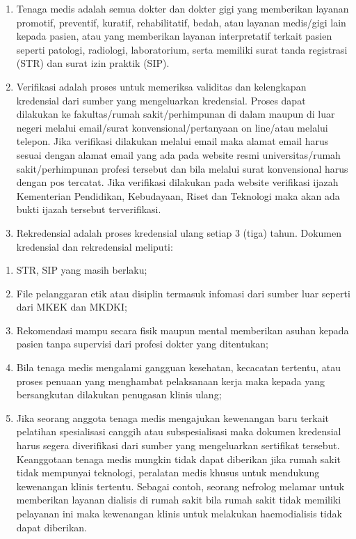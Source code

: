 \documentclass[
]{book}
\providecommand{\tightlist}{%
  \setlength{\itemsep}{0pt}\setlength{\parskip}{0pt}}
\begin{document}
\begin{enumerate}
\item
  Tenaga medis adalah semua dokter dan dokter gigi yang memberikan layanan promotif, preventif, kuratif, rehabilitatif, bedah, atau layanan medis/gigi lain kepada pasien, atau yang memberikan layanan interpretatif terkait pasien seperti patologi, radiologi, laboratorium, serta memiliki surat tanda registrasi (STR) dan surat izin praktik (SIP).
\item
  Verifikasi adalah proses untuk memeriksa validitas dan kelengkapan kredensial dari sumber yang mengeluarkan kredensial. Proses dapat dilakukan ke fakultas/rumah sakit/perhimpunan di dalam maupun di luar negeri melalui email/surat konvensional/pertanyaan on line/atau melalui telepon. Jika verifikasi dilakukan melalui email maka alamat email harus sesuai dengan alamat email yang ada pada website resmi universitas/rumah sakit/perhimpunan profesi tersebut dan bila melalui surat konvensional harus dengan pos tercatat. Jika verifikasi dilakukan pada website verifikasi ijazah Kementerian Pendidikan, Kebudayaan, Riset dan Teknologi maka akan ada bukti ijazah tersebut terverifikasi.
\item
  Rekredensial adalah proses kredensial ulang setiap 3 (tiga) tahun. Dokumen kredensial dan rekredensial meliputi:
\end{enumerate}

\begin{enumerate}
\def\labelenumi{\arabic{enumi}.}
\tightlist
\item
  STR, SIP yang masih berlaku;
\item
  File pelanggaran etik atau disiplin termasuk infomasi dari sumber luar seperti dari MKEK dan MKDKI;
\item
  Rekomendasi mampu secara fisik maupun mental memberikan asuhan kepada pasien tanpa supervisi dari profesi dokter yang ditentukan;
\item
  Bila tenaga medis mengalami gangguan kesehatan, kecacatan tertentu, atau proses penuaan yang menghambat pelaksanaan kerja maka kepada yang bersangkutan dilakukan penugasan klinis ulang;
\item
  Jika seorang anggota tenaga medis mengajukan kewenangan baru terkait pelatihan spesialisasi canggih atau subspesialisasi maka dokumen kredensial harus segera diverifikasi dari sumber yang mengeluarkan sertifikat tersebut. Keanggotaan tenaga medis mungkin tidak dapat diberikan jika rumah sakit tidak mempunyai teknologi, peralatan medis khusus untuk mendukung kewenangan klinis tertentu. Sebagai contoh, seorang nefrolog melamar untuk memberikan layanan dialisis di rumah sakit bila rumah sakit tidak memiliki pelayanan ini maka kewenangan klinis untuk melakukan haemodialisis tidak dapat diberikan.
\end{enumerate}
\end{document}
